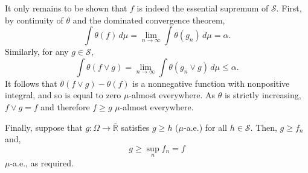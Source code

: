 \documentclass[12pt]{article}
\begin{document}
It only remains to be shown that $f$ is indeed the essential supremum of $\mathcal{S}$.
First, by continuity of $\theta$ and the dominated convergence theorem,
\begin{equation*}
\int\theta(f)\,d\mu=\lim_{n\rightarrow\infty}\int\theta(g_n)\,d\mu=\alpha.
\end{equation*}
Similarly, for any $g\in\mathcal{S}$,
\begin{equation*}
\int\theta(f\vee g)=\lim_{n\rightarrow\infty}\int\theta(g_n\vee g)\,d\mu\le\alpha.
\end{equation*}
It follows that $\theta(f\vee g)-\theta(f)$ is a nonnegative function with nonpositive integral, and so is equal to zero $\mu$-almost everywhere. As $\theta$ is strictly increasing, $f\vee g=f$ and therefore $f\ge g$ $\mu$-almost everywhere.

Finally, suppose that $g\colon \Omega\rightarrow\mathbb{\bar R}$ satisfies $g\ge h$ ($\mu$-a.e.) for all $h\in\mathcal{S}$. Then, $g\ge f_n$ and,
\begin{equation*}
g\ge\sup_nf_n=f
\end{equation*}
$\mu$-a.e., as required.

\end{document}
